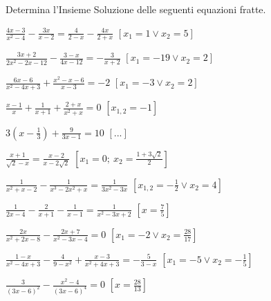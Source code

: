 \begin{esercizio}[\Ast]
 \label{ese:3.43}
Determina l'Insieme Soluzione delle seguenti equazioni fratte.
\begin{enumeratea}
\item$\frac{4 x-3}{x^{2}-4}-\frac{3 x}{x-2} = \frac{4}{2-x}-\frac{4 x}{2 + x}$
  \hfill$\left[x_{1} = 1 \vee x_{2} = 5\right]$
\item$\frac{3 x + 2}{2 x^{2}-2 x-12}-\frac{3-x}{4 x-12} = - \frac{3}{x + 2}$
  \hfill$\left[x_{1} =-19 \vee x_{2} = 2\right]$
\item$\frac{6 x-6}{x^{2}-4 x + 3} + \frac{x^{2}-x-6}{x-3}=-2$
  \hfill$\left[x_{1} =-3 \vee x_{2} = 2\right]$
\item$\frac{x-1}{x} + \frac{1}{x + 1} + \frac{2 + x}{x^{2} + x} =0$
  \hfill$\left[x_{1,2}=-1\right]$
\item$3 \left(x-\frac{1}{3} \right) + \frac{9}{3x-1} = 10$
  \hfill$\left[...\right]$
\item$\frac{x + 1}{\sqrt{2}-x} = \frac{x-2}{x-2 \sqrt{2}}$
  \hfill$\left[x_{1} = 0;~x_{2} = \frac{1 + 3 \sqrt{2}}{2}\right]$
\item$\frac{1}{x^{2} + x-2}-\frac{1}{x^{3}-2 x^{2} + x}=\frac{1}{3 x^{2}-3 x}$
  \hfill$\left[x_{1,2} =-\frac{1}{2} \vee x_{2} = 4\right]$
\item$\frac{1}{2 x-4}-\frac{2}{x + 1}-\frac{1}{x-1}=\frac{1}{x^{2}-3 x + 2}$
  \hfill$\left[x=\frac{7}{5}\right]$
\item$\frac{2 x}{x^{2} + 2 x-8}-\frac{2 x + 7}{x^{2}-3 x-4}= 0$
  \hfill$\left[x_{1} =-2 \vee x_{2} = \frac{28}{17}\right]$
\item$\frac{1-x}{x^{2}-4 x + 3}-\frac{4}{9-x^{2}} + \frac{x- 3}{x^{2} + 4 x + 
3} =-\frac{5}{3-x}$
  \hfill$\left[x_{1} =-5 \vee x_{2} =-\frac{1}{5}\right]$
\item$\frac{3}{(3 x-6)^{2}}-\frac{x^{2}-4}{(3 x-6)^{4}} = 0$
  \hfill$\left[x = \frac{28}{13}\right]$
\end{enumeratea}
\end{esercizio}

